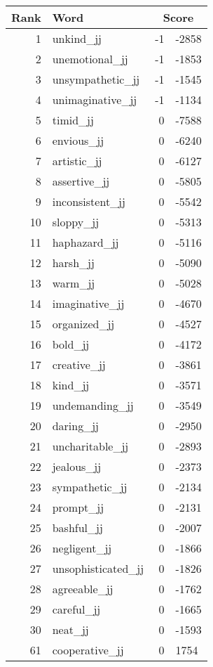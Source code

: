 \begin{longtable}[!htbp]{| rlr@{.}l |}
    \hline
    \textbf{Rank} & \textbf{Word} & \multicolumn{2}{c|}{\textbf{Score}} \\
    \hline
    \endhead
    1 & unkind\_jj & -1 & -2858 \\
    2 & unemotional\_jj & -1 & -1853 \\
    3 & unsympathetic\_jj & -1 & -1545 \\
    4 & unimaginative\_jj & -1 & -1134 \\
    5 & timid\_jj & 0 & -7588 \\
    6 & envious\_jj & 0 & -6240 \\
    7 & artistic\_jj & 0 & -6127 \\
    8 & assertive\_jj & 0 & -5805 \\
    9 & inconsistent\_jj & 0 & -5542 \\
    10 & sloppy\_jj & 0 & -5313 \\
    11 & haphazard\_jj & 0 & -5116 \\
    12 & harsh\_jj & 0 & -5090 \\
    13 & warm\_jj & 0 & -5028 \\
    14 & imaginative\_jj & 0 & -4670 \\
    15 & organized\_jj & 0 & -4527 \\
    16 & bold\_jj & 0 & -4172 \\
    17 & creative\_jj & 0 & -3861 \\
    18 & kind\_jj & 0 & -3571 \\
    19 & undemanding\_jj & 0 & -3549 \\
    20 & daring\_jj & 0 & -2950 \\
    21 & uncharitable\_jj & 0 & -2893 \\
    22 & jealous\_jj & 0 & -2373 \\
    23 & sympathetic\_jj & 0 & -2134 \\
    24 & prompt\_jj & 0 & -2131 \\
    25 & bashful\_jj & 0 & -2007 \\
    26 & negligent\_jj & 0 & -1866 \\
    27 & unsophisticated\_jj & 0 & -1826 \\
    28 & agreeable\_jj & 0 & -1762 \\
    29 & careful\_jj & 0 & -1665 \\
    30 & neat\_jj & 0 & -1593 \\
    61 & cooperative\_jj & 0 & 1754 \\

\end{longtable}
